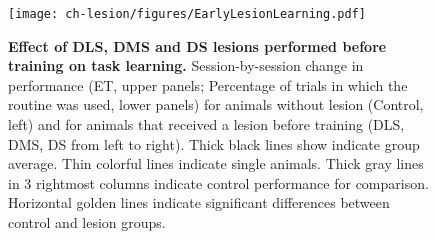 \begin{figure}[bth!]
  \begin{center}
	\texttt{[image: ch-lesion/figures/EarlyLesionLearning.pdf]}
	\caption[]
	{\textbf{Effect of DLS, DMS and DS lesions performed before training on task learning.}
	Session-by-session change in performance (ET, upper panels; Percentage of trials in which the routine was used, lower panels) for animals without lesion (Control, left) and for animals that received a lesion before training (DLS, DMS, DS from left to right). 
	Thick black lines show indicate group average.
    Thin colorful lines indicate single animals.
    Thick gray lines in 3 rightmost columns indicate control performance for comparison.
    Horizontal golden lines indicate significant differences between control and lesion groups. 
	}
	\label{fig:lesion:EarlyLesionLearning}
  \end{center}
\end{figure}